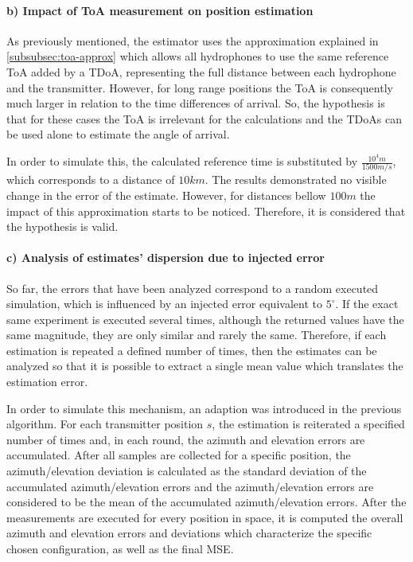\paragraph{b) Impact of ToA measurement on position estimation}

As previously mentioned, the estimator uses the approximation explained in \ref{subsubsec:toa-approx} which allows all hydrophones to use the same reference ToA added by a TDoA, representing the full distance between each hydrophone and the transmitter. However, for long range positions the ToA is consequently much larger in relation to the time differences of arrival. So, the hypothesis is that for these cases the ToA is irrelevant for the calculations and the TDoAs can be used alone to estimate the angle of arrival.

In order to simulate this, the calculated reference time is substituted by $\frac{10^4 m}{1500 m/s}$, which corresponds to a distance of $10 km$. The results demonstrated no visible change in the error of the estimate. However, for distances bellow $100m$ the impact of this approximation starts to be noticed. Therefore, it is considered that the hypothesis is valid. 

\paragraph{c) Analysis of estimates' dispersion due to injected error}

So far, the errors that have been analyzed correspond to a random executed simulation, which is influenced by an injected error equivalent to $5^{\circ}$. If the exact same experiment is executed several times, although the returned values have the same magnitude, they are only similar and rarely the same. Therefore, if each estimation is repeated a defined number of times, then the estimates can be analyzed so that it is possible to extract a single mean value which translates the estimation error.

In order to simulate this mechanism, an adaption was introduced in the previous algorithm. For each transmitter position $s$, the estimation is reiterated a specified number of times and, in each round, the azimuth and elevation errors are accumulated. After all samples are collected for a specific position, the azimuth/elevation deviation is calculated as the standard deviation of the accumulated azimuth/elevation errors and the azimuth/elevation errors are considered to be the mean of the accumulated azimuth/elevation errors. After the measurements are executed for every position in space, it is computed the overall azimuth and elevation errors and deviations which characterize the specific chosen configuration, as well as the final MSE.

